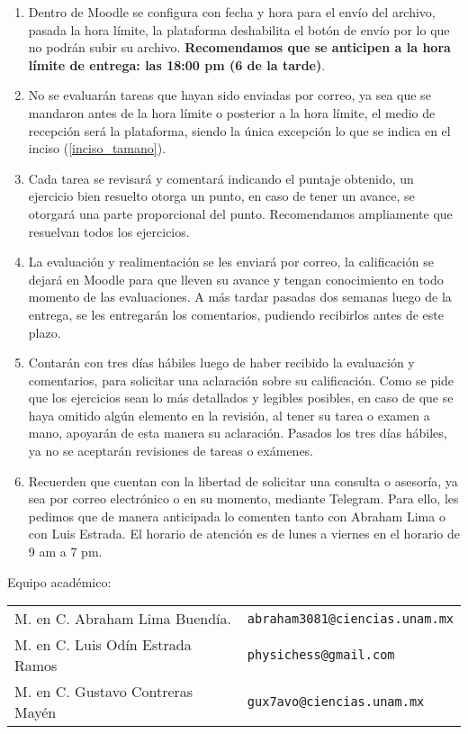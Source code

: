 \begin{enumerate}
\item Dentro de Moodle se configura con fecha y hora para el envío del archivo, pasada la hora límite, la plataforma deshabilita el botón de envío por lo que no podrán subir su archivo. \textbf{Recomendamos que se anticipen a la hora límite de entrega: las 18:00 pm (6 de la tarde)}.
\item No se evaluarán tareas que hayan sido enviadas por correo, ya sea que se mandaron antes de la hora límite o posterior a la hora límite, el medio de recepción será la plataforma, siendo la única excepción lo que se indica en el inciso (\ref{inciso_tamano}).
\item Cada tarea se revisará y comentará indicando el puntaje obtenido, un ejercicio bien resuelto otorga un punto, en caso de tener un avance, se otorgará una parte proporcional del punto. Recomendamos ampliamente que resuelvan todos los ejercicios.
\item La evaluación y realimentación se les enviará por correo, la calificación se dejará en Moodle para que lleven su avance y tengan conocimiento en todo momento de las evaluaciones. A más tardar pasadas dos semanas luego de la entrega, se les entregarán los comentarios, pudiendo recibirlos antes de este plazo.
\item Contarán con tres días hábiles luego de haber recibido la evaluación y comentarios, para solicitar una aclaración sobre su calificación. Como se pide que los ejercicios sean lo más detallados y legibles posibles, en caso de que se haya omitido algún elemento en la revisión, al tener su tarea o examen a mano, apoyarán de esta manera su aclaración. Pasados los tres días hábiles, ya no se aceptarán revisiones de tareas o exámenes.
\item Recuerden que cuentan con la libertad de solicitar una consulta o asesoría, ya sea por correo electrónico o en su momento, mediante Telegram. Para ello, les pedimos que de manera anticipada lo comenten tanto con Abraham Lima o con Luis Estrada. El horario de atención es de lunes a viernes en el horario de 9 am a 7 pm.
\end{enumerate}

\noindent
Equipo académico:
\begin{table}[H]
\hspace{-0.5cm}
\large
\begin{tabular}{l l}
M. en C. Abraham Lima Buendía. & \texttt{abraham3081@ciencias.unam.mx} \\
M. en C. Luis Odín Estrada Ramos & \texttt{physichess@gmail.com} \\
M. en C. Gustavo Contreras Mayén & \texttt{gux7avo@ciencias.unam.mx}
\end{tabular}
\end{table}

